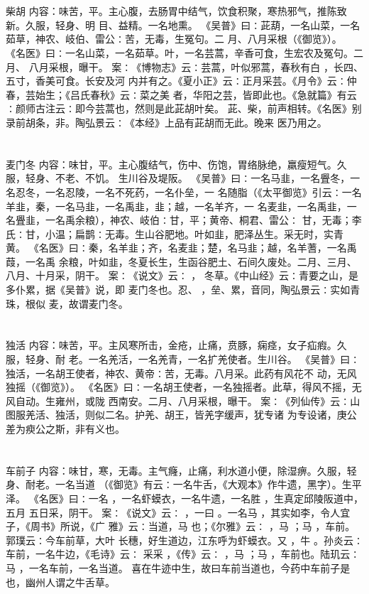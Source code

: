 \documentclass[12pt,UTF8]{ctexbook}
\begin{document}
\chapter{}柴胡
内容：味苦，平。主心腹，去肠胃中结气，饮食积聚，寒热邪气，推陈致新。久服，轻身、明 
目、益精。一名地熏。 
《吴普》曰∶茈葫，一名山菜，一名茹草，神农、岐伯、雷公∶苦，无毒，生冤句。二 
月、八月采根（《御览》）。 
《名医》曰∶一名山菜，一名茹草。叶，一名芸蒿，辛香可食，生宏农及冤句。二月、 
八月采根，曝干。 
案∶《博物志》云∶芸蒿，叶似邪蒿，春秋有白 ，长四、五寸，香美可食。长安及河 
内并有之。《夏小正》云∶正月采芸。《月令》云∶仲春，芸始生；《吕氏春秋》云∶菜之美 
者，华阳之芸，皆即此也。《急就篇》有云∶颜师古注云∶即今芸蒿也，然则是此茈胡叶矣。 
茈、柴，前声相转。《名医》别录前胡条，非。陶弘景云∶《本经》上品有茈胡而无此。晚来 
医乃用之。 


\chapter{}麦门冬
内容：味甘，平。主心腹结气，伤中、伤饱，胃络脉绝，羸瘦短气。久服，轻身、不老、不饥。 
生川谷及堤阪。 
《吴普》曰∶一名马韭，一名舋冬，一名忍冬，一名忍陵，一名不死药，一名仆垒，一 
名随脂（《太平御览》引云∶一名羊韭，秦，一名马韭，一名禹韭，韭；越，一名羊齐，一 
名麦韭，一名禹韭，一名舋韭，一名禹余粮），神农、岐伯∶甘，平；黄帝、桐君、雷公∶ 
甘，无毒；李氏∶甘，小温；扁鹊∶无毒。生山谷肥地。叶如韭，肥泽丛生。采无时，实青 
黄。 
《名医》曰∶秦，名羊韭；齐，名麦韭；楚，名马韭；越，名羊蓍，一名禹葭，一名禹 
余粮，叶如韭，冬夏长生，生函谷肥土、石间久废处。二月、三月、八月、十月采，阴干。 
案∶《说文》云∶ ， 冬草。《中山经》云∶青要之山，是多仆累，据《吴普》说，即 
麦门冬也。忍、 ，垒、累，音同，陶弘景云∶实如青珠，根似 麦，故谓麦门冬。 


\chapter{}独活
内容：味苦，平。主风寒所击，金疮，止痛，贲豚，痫痉，女子疝瘕。久服，轻身、耐 
老。一名羌活，一名羌青，一名扩羌使者。生川谷。 
《吴普》曰∶独活，一名胡王使者，神农、黄帝∶苦，无毒。八月采。此药有风花不 
动，无风独摇（《御览》）。 
《名医》曰∶一名胡王使者，一名独摇者。此草，得风不摇，无风自动。生雍州，或陇 
西南安。二月、八月采根，曝干。 
案∶《列仙传》云∶山图服羌活、独活，则似二名。护羌、胡王，皆羌字缓声，犹专诸 
为专设诸，庚公差为瘐公之斯，非有义也。 


\chapter{}车前子
内容：味甘，寒，无毒。主气癃，止痛，利水道小便，除湿痹。久服，轻身、耐老。一名当道 
（《御览》有云∶一名牛舌，《大观本》作牛遗，黑字）。生平泽。 
《名医》曰∶一名 ，一名虾蟆衣，一名牛遗，一名胜 ，生真定邱陵阪道中，五月 
五日采，阴干。 
案∶《说文》云∶ ，一曰 。一名马 ，其实如李，令人宜子，《周书》所说，《广 
雅》云∶当道，马 也；《尔雅》云∶ ，马 ；马 ，车前。郭璞云∶今车前草，大叶 
长穗，好生道边，江东呼为虾蟆衣。又 ，牛 。孙炎云∶车前，一名牛边，《毛诗》云∶ 
采采 ，《传》云∶ ，马 ；马 ，车前也。陆玑云∶马 ，一名车前，一名当道。 
喜在牛迹中生，故曰车前当道也，今药中车前子是也，幽州人谓之牛舌草。 
\end{document}
